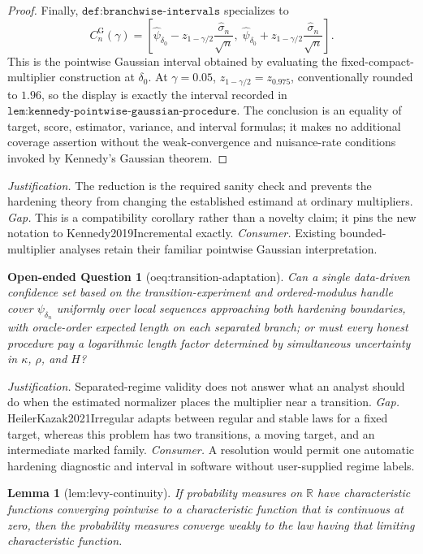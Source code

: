\documentclass{article}
\newtheorem{lemma}{Lemma}
\newtheorem{openendedquestion}{Open-ended Question}
\begin{document}
\begin{proof}
Finally, \(\texttt{def:branchwise-intervals}\) specializes to
\[
C_n^{\mathrm G}(\gamma)
=\left[
\widehat\psi_{\delta_0}
-z_{1-\gamma/2}\frac{\widehat\sigma_n}{\sqrt n},\;
\widehat\psi_{\delta_0}
+z_{1-\gamma/2}\frac{\widehat\sigma_n}{\sqrt n}
\right].
\]
This is the pointwise Gaussian interval obtained by evaluating the
fixed-compact-multiplier construction at \(\delta_0\).  At
\(\gamma=0.05\), \(z_{1-\gamma/2}=z_{0.975}\), conventionally rounded to
\(1.96\), so the display is exactly the interval recorded in
\(\texttt{lem:kennedy-pointwise-gaussian-procedure}\).  The conclusion is
an equality of target, score, estimator, variance, and interval formulas;
it makes no additional coverage assertion without the weak-convergence
and nuisance-rate conditions invoked by Kennedy's Gaussian theorem.
\end{proof}
\par\smallskip\noindent \textit{Justification.} The reduction is the required sanity check and prevents the hardening theory from changing the established estimand at ordinary multipliers. \textit{Gap.} This is a compatibility corollary rather than a novelty claim; it pins the new notation to Kennedy2019Incremental exactly. \textit{Consumer.} Existing bounded-multiplier analyses retain their familiar pointwise Gaussian interpretation.

\begin{openendedquestion}[oeq:transition-adaptation]\label{oeq:transition-adaptation}
Can a single data-driven confidence set based on the transition-experiment and ordered-modulus handle cover \(\psi_{\delta_n}\) uniformly over local sequences approaching both hardening boundaries, with oracle-order expected length on each separated branch; or must every honest procedure pay a logarithmic length factor determined by simultaneous uncertainty in \(\kappa\), \(\rho\), and \(H\)?
\end{openendedquestion}
\par\smallskip\noindent \textit{Justification.} Separated-regime validity does not answer what an analyst should do when the estimated normalizer places the multiplier near a transition. \textit{Gap.} HeilerKazak2021Irregular adapts between regular and stable laws for a fixed target, whereas this problem has two transitions, a moving target, and an intermediate marked family. \textit{Consumer.} A resolution would permit one automatic hardening diagnostic and interval in software without user-supplied regime labels.

\begin{lemma}[lem:levy-continuity]\label{lem:levy-continuity}
If probability measures on \(\mathbb R\) have characteristic functions converging pointwise to a characteristic function that is continuous at zero, then the probability measures converge weakly to the law having that limiting characteristic function.
\end{lemma}
\end{document}
